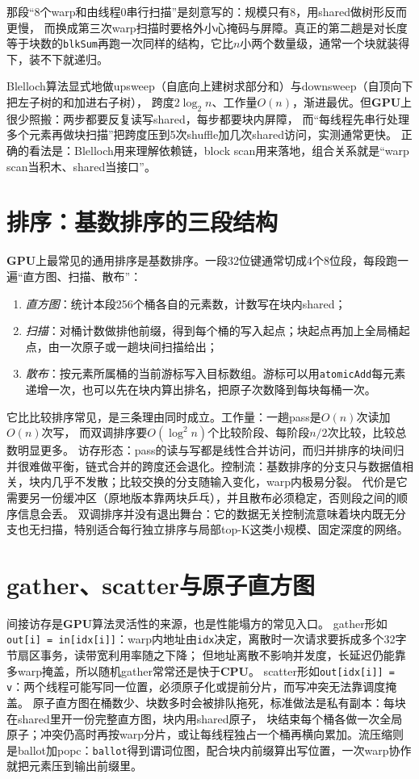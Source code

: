 \documentclass[12pt,a4paper,fontset=fandol]{ctexbook}
\newcommand{\Tp}[1]{\texttt{#1}}
\newcommand{\Dom}[1]{\textsf{\bfseries #1}}
\newcommand{\CPU}{\Dom{CPU}}
\newcommand{\GPU}{\Dom{GPU}}
\begin{document}
那段``8个warp和由线程0串行扫描''是刻意写的：规模只有8，用shared做树形反而更慢，
而换成第三次warp扫描时要格外小心掩码与屏障。真正的第二趟是对长度等于块数的\Tp{blkSum}再跑一次同样的结构，它比$n$小两个数量级，通常一个块就装得下，装不下就递归。

Blelloch算法显式地做upsweep（自底向上建树求部分和）与downsweep（自顶向下把左子树的和加进右子树），
跨度$2\log_2 n$、工作量$O(n)$，渐进最优。但\GPU{}上很少照搬：两步都要反复读写shared，每步都要块内屏障，
而``每线程先串行处理多个元素再做块扫描''把跨度压到5次shuffle加几次shared访问，实测通常更快。
正确的看法是：Blelloch用来理解依赖链，block scan用来落地，组合关系就是``warp scan当积木、shared当接口''。

\section{排序：基数排序的三段结构}

\GPU{}上最常见的通用排序是基数排序。一段32位键通常切成4个8位段，每段跑一遍``直方图、扫描、散布''：
\begin{enumerate}
\item \emph{直方图}：统计本段256个桶各自的元素数，计数写在块内shared；
\item \emph{扫描}：对桶计数做排他前缀，得到每个桶的写入起点；块起点再加上全局桶起点，由一次原子或一趟块间扫描给出；
\item \emph{散布}：按元素所属桶的当前游标写入目标数组。游标可以用\Tp{atomicAdd}每元素递增一次，也可以先在块内算出排名，把原子次数降到每块每桶一次。
\end{enumerate}

它比比较排序常见，是三条理由同时成立。工作量：一趟pass是$O(n)$次读加$O(n)$次写，
而双调排序要$O(\log^2 n)$个比较阶段、每阶段$n/2$次比较，比较总数明显更多。
访存形态：pass的读与写都是线性合并访问，而归并排序的块间归并很难做平衡，链式合并的跨度还会退化。控制流：基数排序的分支只与数据值相关，块内几乎不发散；比较交换的分支随输入变化，warp内极易分裂。
代价是它需要另一份缓冲区（原地版本靠两块乒乓），并且散布必须稳定，否则段之间的顺序信息会丢。
双调排序并没有退出舞台：它的数据无关控制流意味着块内既无分支也无扫描，特别适合每行独立排序与局部top-K这类小规模、固定深度的网络。

\section{gather、scatter与原子直方图}

间接访存是\GPU{}算法灵活性的来源，也是性能塌方的常见入口。
gather形如\Tp{out[i] = in[idx[i]]}：warp内地址由\Tp{idx}决定，离散时一次请求要拆成多个32字节扇区事务，读带宽利用率随之下降；
但地址离散不影响并发度，长延迟仍能靠多warp掩盖，所以随机gather常常还是快于\CPU{}。
scatter形如\Tp{out[idx[i]] = v}：两个线程可能写同一位置，必须原子化或提前分片，而写冲突无法靠调度掩盖。
原子直方图在桶数少、块数多时会被排队拖死，标准做法是私有副本：每块在shared里开一份完整直方图，块内用shared原子，
块结束每个桶各做一次全局原子；冲突仍高时再按warp分片，或让每线程独占一个桶再横向累加。流压缩则是ballot加popc：\Tp{ballot}得到谓词位图，配合块内前缀算出写位置，一次warp协作就把元素压到输出前缀里。
\end{document}
